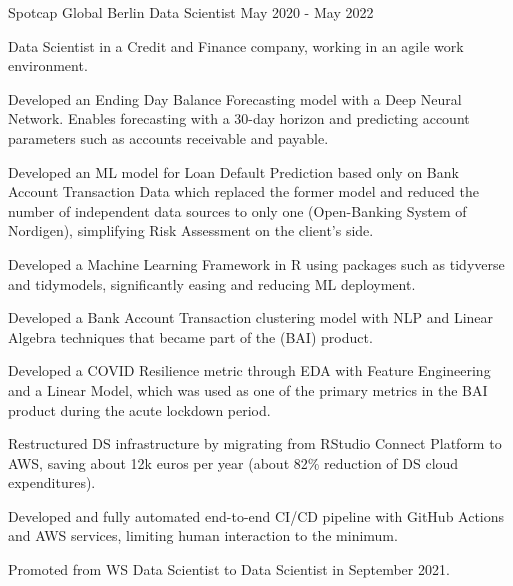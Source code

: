 \begin{cventries}
  \cventry
    {Spotcap Global}
    {Berlin}
    {Data Scientist}
    {May 2020 - May 2022}
    {
      \begin{cvitems}
        \item{Data Scientist in a Credit and Finance company, working in an agile work environment.}
        \item{Developed an Ending Day Balance Forecasting model with a Deep Neural Network. Enables forecasting with a 30-day horizon and predicting account parameters such as accounts receivable and payable.}
        \item{Developed an ML model for Loan Default Prediction based only on Bank Account Transaction Data which replaced the former model and reduced the number of independent data sources to only one (Open-Banking System of Nordigen), simplifying Risk Assessment on the client's side.}
        \item{Developed a Machine Learning Framework in R using packages such as tidyverse and tidymodels, significantly easing and reducing ML deployment.}
        \item{Developed a Bank Account Transaction clustering model with NLP and Linear Algebra techniques that became part of the  (BAI) product.}
        \item{Developed a COVID Resilience metric through EDA with Feature Engineering and a Linear Model, which was used as one of the primary metrics in the BAI product during the acute lockdown period.}
        \item{Restructured DS infrastructure by migrating from RStudio Connect Platform to AWS, saving about 12k euros per year (about 82\% reduction of DS cloud expenditures).}
        \item{Developed and fully automated end-to-end CI/CD pipeline with GitHub Actions and AWS services, limiting human interaction to the minimum.}
        \item{Promoted from WS Data Scientist to Data Scientist in September 2021.}
      \end{cvitems}
    }


\end{cventries}
